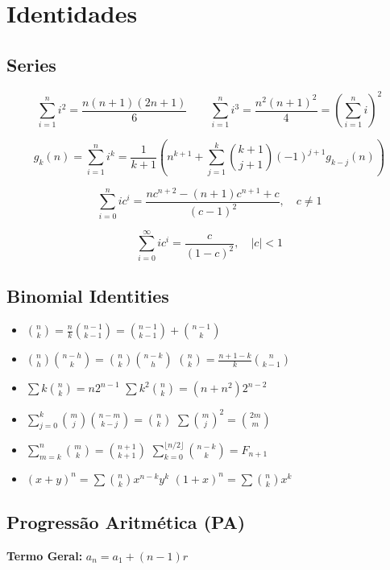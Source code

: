 \section{Identidades}

\subsection{Series}

$$\sum_{i=1}^{n} i^{2} = \frac{n(n+1)(2n+1)}{6}  \qquad  \sum_{i=1}^{n} i^{3} = \frac{n^{2}(n+1)^{2}}{4} = \left(\sum_{i=1}^n i\right)^2$$

$$ g_k(n) = \sum_{i=1}^n i^k = \frac{1}{k+1} \left( n^{k+1} + \sum_{j=1}^k \binom{k+1}{j+1} (-1)^{j+1} g_{k-j}(n) \right) $$

$$\sum_{i=0}^{n} ic^{i} = \frac{nc^{n+2} - (n+1)c^{n+1} + c}{(c-1)^{2}}, \quad c \neq 1$$

$$\sum_{i=0}^{\infty} ic^{i} = \frac{c}{(1-c)^{2}}, \quad |c| < 1$$

\subsection{Binomial Identities}

\begin{itemize}[leftmargin=*, nosep]
    \item $\binom{n}{k} = \frac{n}{k}\binom{n-1}{k-1} = \binom{n-1}{k-1} + \binom{n-1}{k}$
    \item $\binom{n}{h}\binom{n-h}{k} = \binom{n}{k}\binom{n-k}{h}$ \hfill $\binom{n}{k} = \frac{n+1-k}{k} \binom{n}{k-1}$
    \item $\sum k \binom{n}{k} = n 2^{n-1}$ \hfill $\sum k^2 \binom{n}{k} = (n+n^2)2^{n-2}$
    \item $\sum_{j=0}^k \binom{m}{j}\binom{n-m}{k-j} = \binom{n}{k}$ \hfill $\sum \binom{m}{j}^2 = \binom{2m}{m}$
    \item $\sum_{m=k}^n \binom{m}{k} = \binom{n+1}{k+1}$ \hfill $\sum_{k=0}^{\lfloor n/2 \rfloor} \binom{n-k}{k} = F_{n+1}$
    \item $(x+y)^n = \sum \binom{n}{k}x^{n-k}y^k$ \hfill $(1+x)^n = \sum \binom{n}{k}x^k$
\end{itemize}


\subsection{Progressão Aritmética (PA)}

\textbf{Termo Geral:} \quad $ a_n = a_1 + (n-1)r $

